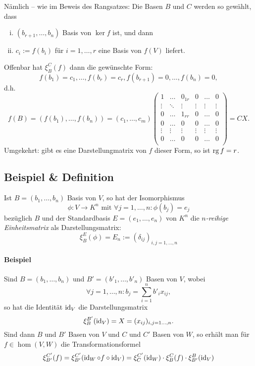 	Nämlich -- wie im Beweis des Rangsatzes: Die Basen $ B $ und $ C $ werden so gewählt, dass
		 \begin{enumerate}[(i)]
		 	\item $ (b_{r+1},\dots,b_n) $ Basis von $ \ker f $ ist, und dann
		 	\item $ c_i := f(b_i) $ für $ i= 1,\dots,r $ eine Basis von $ f(V) $ liefert.
		 \end{enumerate}
	Offenbar hat $ \xi_B^C(f)$ dann die gewünschte Form:
		\[ f(b_1)=c_1,\dots,f(b_r)=c_r,f(b_{r+1})=0,\dots,f(b_n)=0, \]
	d.h.
		\[ f(B) = (f(b_1),\dots,f(b_n))=(c_1,\dots,c_m)\left(\begin{array}{ccc|ccc}
		1      & \dots  & 0_{1r} & 0      &\dots &0 \\
		\vdots & \ddots & \vdots & \vdots &\vdots&\vdots\\
		0      & \dots  & 1_{rr} & 0      &\dots &0 \\\hline
		0      & \dots  & 0      & 0      &\dots &0 \\
		\vdots & \vdots & \vdots & \vdots &\vdots&\vdots \\
                0      & \dots  & 0      & 0      &\dots &0\\
		\end{array}\right) = CX. \]
	Umgekehrt: gibt es eine Darstellungmatrix von $ f $ dieser Form, so ist $ \operatorname{rg} f = r $.
\subsection{Beispiel \& Definition}
	\begin{Definition}[Einheitsmatrix]
	Ist $ B=(b_1,\dots,b_n) $ Basis von $ V $, so hat der Isomorphismus
		\[ \phi:V\to K^n \text{ mit } \forall j=1,\dots,n:\phi(b_j)=e_j \]
	bezüglich $ B $ und der Standardbasis $ E = (e_1,\dots,e_n) $ von $ K^n $ die \emph{$ n $-reihige Einheitsmatrix} als Darstellungsmatrix:
		\[ \xi_B^E(\phi) = E_n := (\delta_{ij})_{i,j = 1,\dots,n} \]
	\end{Definition}
\paragraph{Beispiel}
	Sind $ B=(b_1,\dots,b_n) $ und $ B'=(b'_1,\dots,b'_n) $ Basen von $ V $, wobei
		\[ \forall j=1,\dots,n:b_j = \sum_{i=1}^{n}b'_ix_{ij}, \]
	so hat die Identität $ \operatorname{id}_V $ die Darstellungsmatrix
		\[ \xi_B^{B'}(\operatorname{id}_V)= X = (x_{ij})_{i,j=1\dots,n}. \]
	Sind dann $ B $ und $ B' $ Basen von $ V $ und $ C $ und $ C' $ Basen von $ W $, so erhält man für $ f\in\hom(V,W) $ die Transformationsformel
		\[ \xi_{B'}^{C'}(f) = \xi_{B'}^{C'}(\operatorname{id}_W\circ f\circ \operatorname{id}_V) = \xi_C^{C'}(\operatorname{id}_W)\cdot \xi_B^C(f)\cdot \xi_{B'}^{B}(\operatorname{id}_V) \]
